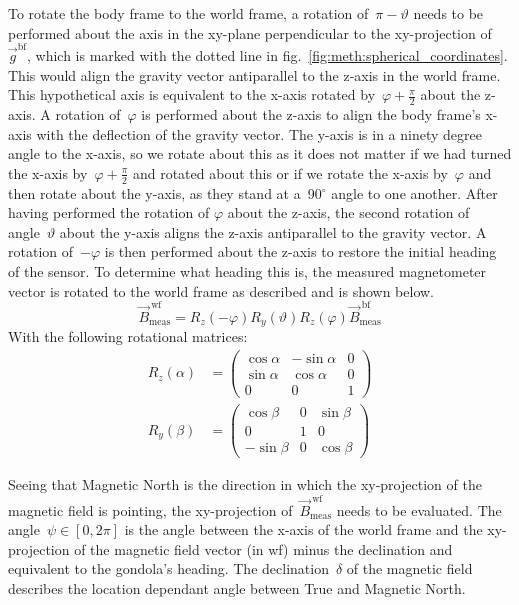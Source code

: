 To rotate the body frame to the world frame, a rotation of~$\pi-\vartheta$ needs to be performed about the axis in the xy-plane perpendicular to the xy-projection of~$\vec{g}^{\mathrm{bf}}$, which is marked with the dotted line in fig.~\ref{fig:meth:spherical_coordinates}. This would align the gravity vector antiparallel to the z-axis in the world frame. This hypothetical axis is equivalent to the x-axis rotated by~$\varphi+\frac{\pi}{2}$ about the z-axis. A rotation of~$\varphi$ is performed about the z-axis to align the body frame's x-axis with the deflection of the gravity vector. The y-axis is in  a ninety degree angle to the x-axis, so we rotate about this as it does not matter if we had turned the x-axis by~$\varphi+\frac{\pi}{2}$ and rotated about this or if we rotate the x-axis by~$\varphi$ and then rotate about the y-axis, as they stand at a~90$^\circ$ angle to one another. After having performed the rotation of $\varphi$ about the z-axis, the second rotation of angle~$\vartheta$ about the y-axis aligns the z-axis antiparallel to the gravity vector. A rotation of~$-\varphi$ is then performed about the z-axis to restore the initial heading of the sensor. To determine what heading this is, the measured magnetometer vector is rotated to the world frame as described and is shown below.
\begin{equation}
    \vec{B}_{\mathrm{meas}}^{\ \mathrm{wf}}=R_z(-\varphi)R_y(\vartheta)R_z(\varphi)\vec{B}_{\mathrm{meas}}^{\ \mathrm{bf}}
\end{equation}
With the following rotational matrices:
\begin{align}
    R_z(\alpha)&=\begin{pmatrix}
                \cos\alpha & -\sin\alpha & 0 \\
                \sin\alpha & \cos\alpha & 0 \\
                0 & 0 & 1
                \end{pmatrix} \\
    R_y(\beta)&=\begin{pmatrix}
                \cos\beta & 0 & \sin\beta \\
                0 & 1 & 0 \\
                -\sin\beta & 0 & \cos\beta
                \end{pmatrix}
\end{align}

Seeing that Magnetic North is the direction in which the xy-projection of the magnetic field is pointing, the xy-projection of~$\vec{B}_{\mathrm{meas}}^{\ \mathrm{wf}}$ needs to be evaluated. The angle~$\psi\in[0,2\pi]$ is the angle between the x-axis of the world frame and the xy-projection of the magnetic field vector (in wf) minus the declination and equivalent to the gondola's heading. The declination~$\delta$ of the magnetic field describes the location dependant angle between True and Magnetic North.

